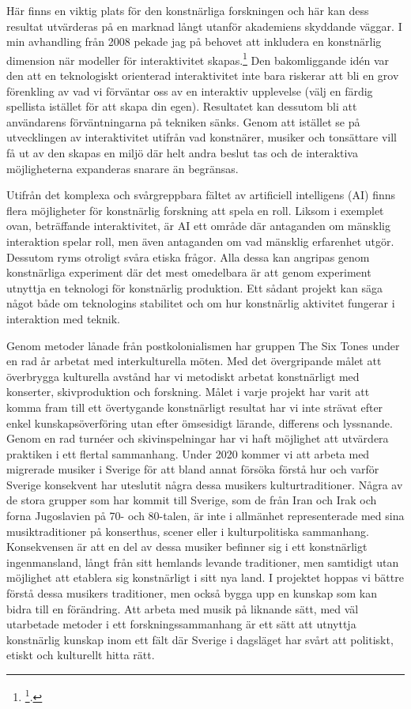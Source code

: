 \documentclass[11pt]{article}
\begin{document}
Här finns en viktig plats för den konstnärliga forskningen och här kan
dess resultat utvärderas på en marknad långt utanför akademiens
skyddande väggar. I min avhandling från 2008 pekade jag på behovet att
inkludera en konstnärlig dimension när modeller för interaktivitet
skapas.\footnote{\footcite{frisk08phd}.} Den bakomliggande idén var den att en teknologiskt
orienterad interaktivitet inte bara riskerar att bli en grov förenkling
av vad vi förväntar oss av en interaktiv upplevelse (välj en färdig
spellista istället för att skapa din egen). Resultatet kan dessutom bli
att användarens förväntningarna på tekniken sänks. Genom att istället se
på utvecklingen av interaktivitet utifrån vad konstnärer, musiker och
tonsättare vill få ut av den skapas en miljö där helt andra beslut tas
och de interaktiva möjligheterna expanderas snarare än begränsas.

Utifrån det komplexa och svårgreppbara fältet av artificiell intelligens
(AI) finns flera möjligheter för konstnärlig forskning att spela en
roll. Liksom i exemplet ovan, beträffande interaktivitet, är AI ett
område där antaganden om mänsklig interaktion spelar roll, men även
antaganden om vad mänsklig erfarenhet utgör. Dessutom ryms otroligt
svåra etiska frågor. Alla dessa kan angripas genom konstnärliga
experiment där det mest omedelbara är att genom experiment utnyttja en
teknologi för konstnärlig produktion. Ett sådant projekt kan säga något
både om teknologins stabilitet och om hur konstnärlig aktivitet fungerar
i interaktion med teknik.

Genom metoder lånade från postkolonialismen har gruppen The Six Tones
under en rad år arbetat med interkulturella möten. Med det övergripande
målet att överbrygga kulturella avstånd har vi metodiskt arbetat
konstnärligt med konserter, skivproduktion och forskning. Målet i varje
projekt har varit att komma fram till ett övertygande konstnärligt
resultat har vi inte strävat efter enkel kunskapsöverföring utan efter
ömsesidigt lärande, differens och lyssnande. Genom en rad turnéer och
skivinspelningar har vi haft möjlighet att utvärdera praktiken i ett
flertal sammanhang. Under 2020 kommer vi att arbeta med migrerade
musiker i Sverige för att bland annat försöka förstå hur och varför
Sverige konsekvent har uteslutit några dessa musikers kulturtraditioner.
Några av de stora grupper som har kommit till Sverige, som de från Iran
och Irak och forna Jugoslavien på 70- och 80-talen, är inte i allmänhet
representerade med sina musiktraditioner på konserthus, scener eller i
kulturpolitiska sammanhang. Konsekvensen är att en del av dessa musiker
befinner sig i ett konstnärligt ingenmansland, långt från sitt hemlands
levande traditioner, men samtidigt utan möjlighet att etablera sig
konstnärligt i sitt nya land. I projektet hoppas vi bättre förstå dessa
musikers traditioner, men också bygga upp en kunskap som kan bidra till
en förändring. Att arbeta med musik på liknande sätt, med väl utarbetade
metoder i ett forskningssammanhang är ett sätt att utnyttja konstnärlig
kunskap inom ett fält där Sverige i dagsläget har svårt att politiskt,
etiskt och kulturellt hitta rätt.
\end{document}
